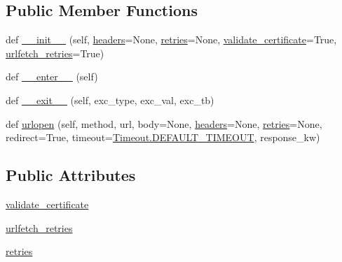 \subsection*{Public Member Functions}
\begin{DoxyCompactItemize}
\item 
def \hyperlink{classpip_1_1__vendor_1_1urllib3_1_1contrib_1_1appengine_1_1AppEngineManager_a326752207b6e6a55e0227e4e3bbe410a}{\+\_\+\+\_\+init\+\_\+\+\_\+} (self, \hyperlink{classpip_1_1__vendor_1_1urllib3_1_1request_1_1RequestMethods_a507ade459b427bd81a5a8849563702e3}{headers}=None, \hyperlink{classpip_1_1__vendor_1_1urllib3_1_1contrib_1_1appengine_1_1AppEngineManager_a24843a36de1346f7d21cd4782d2e83c5}{retries}=None, \hyperlink{classpip_1_1__vendor_1_1urllib3_1_1contrib_1_1appengine_1_1AppEngineManager_a2879d8f7ad8c21d427ed63f232f08fe7}{validate\+\_\+certificate}=True, \hyperlink{classpip_1_1__vendor_1_1urllib3_1_1contrib_1_1appengine_1_1AppEngineManager_a83b60dd1620e648d4c13ab6664efd325}{urlfetch\+\_\+retries}=True)
\item 
def \hyperlink{classpip_1_1__vendor_1_1urllib3_1_1contrib_1_1appengine_1_1AppEngineManager_a2fc3da25ad5cb657e66403d4b199998e}{\+\_\+\+\_\+enter\+\_\+\+\_\+} (self)
\item 
def \hyperlink{classpip_1_1__vendor_1_1urllib3_1_1contrib_1_1appengine_1_1AppEngineManager_ad32aa393de5408a17ab2a07e552a3e5f}{\+\_\+\+\_\+exit\+\_\+\+\_\+} (self, exc\+\_\+type, exc\+\_\+val, exc\+\_\+tb)
\item 
def \hyperlink{classpip_1_1__vendor_1_1urllib3_1_1contrib_1_1appengine_1_1AppEngineManager_ad1dcd5af93b340ad2b199ce5ddb532fb}{urlopen} (self, method, url, body=None, \hyperlink{classpip_1_1__vendor_1_1urllib3_1_1request_1_1RequestMethods_a507ade459b427bd81a5a8849563702e3}{headers}=None, \hyperlink{classpip_1_1__vendor_1_1urllib3_1_1contrib_1_1appengine_1_1AppEngineManager_a24843a36de1346f7d21cd4782d2e83c5}{retries}=None, redirect=True, timeout=\hyperlink{classpip_1_1__vendor_1_1urllib3_1_1util_1_1timeout_1_1Timeout_ab2e2090779413149cdac51e5b0908e12}{Timeout.\+D\+E\+F\+A\+U\+L\+T\+\_\+\+T\+I\+M\+E\+O\+UT}, response\+\_\+kw)
\end{DoxyCompactItemize}
\subsection*{Public Attributes}
\begin{DoxyCompactItemize}
\item 
\hyperlink{classpip_1_1__vendor_1_1urllib3_1_1contrib_1_1appengine_1_1AppEngineManager_a2879d8f7ad8c21d427ed63f232f08fe7}{validate\+\_\+certificate}
\item 
\hyperlink{classpip_1_1__vendor_1_1urllib3_1_1contrib_1_1appengine_1_1AppEngineManager_a83b60dd1620e648d4c13ab6664efd325}{urlfetch\+\_\+retries}
\item 
\hyperlink{classpip_1_1__vendor_1_1urllib3_1_1contrib_1_1appengine_1_1AppEngineManager_a24843a36de1346f7d21cd4782d2e83c5}{retries}
\end{DoxyCompactItemize}


